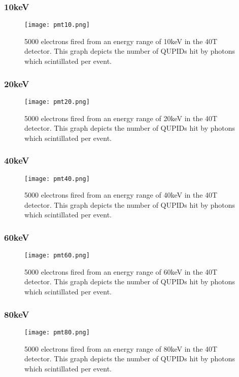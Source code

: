\documentclass[11pt,a4paper,oneside]{report}
\begin{document}
\subsubsection{10keV}
\begin{figure}[htb]
\centering
\texttt{[image: pmt10.png]}
\caption{5000 electrons fired from an energy range of 10keV in the 40T detector. This graph depicts the number of QUPIDs hit by photons which scintillated per event.}
\end{figure}

\newpage
\subsubsection{20keV}
\begin{figure}[htb]
\centering
\texttt{[image: pmt20.png]}
\caption{5000 electrons fired from an energy range of 20keV in the 40T detector. This graph depicts the number of QUPIDs hit by photons which scintillated per event.}
\end{figure}


\subsubsection{40keV}
\begin{figure}[htb]
\centering
\texttt{[image: pmt40.png]}
\caption{5000 electrons fired from an energy range of 40keV in the 40T detector.  This graph depicts the number of QUPIDs hit by photons which scintillated per event.}
\end{figure}

\newpage
\subsubsection{60keV}
\begin{figure}[htb]
\centering
\texttt{[image: pmt60.png]}
\caption{5000 electrons fired from an energy range of 60keV in the 40T detector.  This graph depicts the number of QUPIDs hit by photons which scintillated per event.}
\end{figure}

\subsubsection{80keV}
\begin{figure}[htb]
\centering
\texttt{[image: pmt80.png]}
\caption{5000 electrons fired from an energy range of 80keV in the 40T detector. This graph depicts the number of QUPIDs hit by photons which scintillated per event.}
\end{figure}
\end{document}
